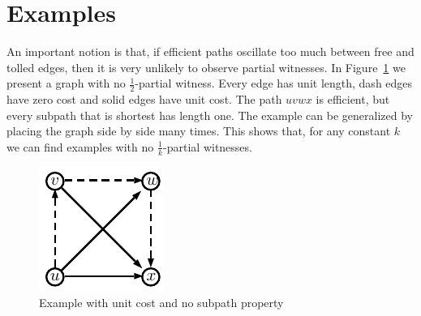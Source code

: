 \documentclass[letterpaper,11pt]{article}
\begin{document}
\section{Examples}

An important notion is that, if efficient paths oscillate too much between free and tolled edges, then it is very unlikely to observe partial witnesses.
In Figure~\ref{fig:nosubpath} we present a graph with no $\frac{1}{2}$-partial witness.
Every edge has unit length, dash edges have zero cost and solid edges have unit cost.
The path $uvwx$ is efficient, but every subpath that is shortest has length one.
The example can be generalized by placing the graph side by side many times.
This shows that, for any constant $k$ we can find examples with no $\frac{1}{k}$-partial witnesses.


\begin{figure}
\caption{Example with unit cost and no subpath property}
\label{fig:nosubpath}
\centering
\includegraphics[scale=1.3]{TexImg/Nosubpath.pdf}
\end{figure}



\end{document}
